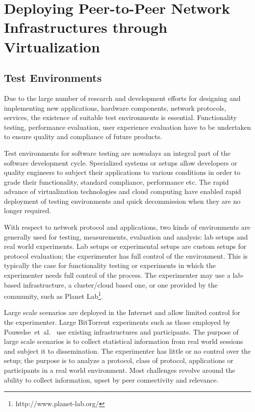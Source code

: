 
\chapter{Deploying Peer-to-Peer Network Infrastructures through
Virtualization}
\label{chapter:virt-infra}

\section{Test Environments}
\label{sec:virt-infra-test-environments}

Due to the large number of research and development efforts for designing and
implementing new applications, hardware components, network protocols,
services, the existence of suitable test environments is essential.
Functionality testing, performance evaluation, user experience evaluation have
to be undertaken to ensure quality and compliance of future products.

Test environments for software testing are nowadays an integral part of the
software development cycle. Specialized systems or setups allow developers or
quality engineers to subject their applications to various conditions in order
to grade their functionality, standard compliance, performance etc. The rapid
advance of virtualization technologies and cloud computing have enabled rapid
deployment of testing environments and quick decommission when they are no
longer required.

With respect to network protocol and applications, two kinds of environments
are generally used for testing, measurements, evaluation and analysis: lab
setups and real world experiments. Lab setups or experimental setups are
custom setups for protocol evaluation; the experimenter has full control of
the environment. This is typically the case for functionality testing or
experiments in which the experimenter needs full control of the process. The
experimenter may use a lab-based infrastructure, a cluster/cloud based one, or
one provided by the community, such as Planet
Lab\footnote{http://www.planet-lab.org/}.

Large scale scenarios are deployed in the Internet and allow limited control
for the experimenter. Large BitTorrent experiments such as those employed by
Pouwelse~et~al.~\cite{measurement-study} use existing infrastructures and
participants. The purpose of large scale scenarios is to collect statistical
information from real world sessions and subject it to dissemination. The
experimenter has little or no control over the setup; the purpose is to
analyze a protocol, class of protocol, applications or participants in a real
world environment. Most challenges revolve around the ability to collect
information, upset by peer connectivity and relevance.

